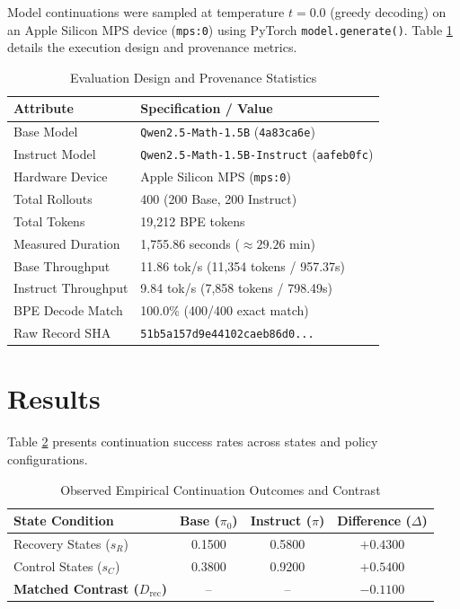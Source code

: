 \documentclass[conference]{IEEEtran}
\begin{document}
Model continuations were sampled at temperature $t=0.0$ (greedy decoding) on an Apple Silicon MPS device (\texttt{mps:0}) using PyTorch \texttt{model.generate()}. Table \ref{tab:provenance} details the execution design and provenance metrics.

\begin{table}[htbp]
\caption{Evaluation Design and Provenance Statistics}
\label{tab:provenance}
\centering
\begin{tabularx}{\columnwidth}{Xp{4.2cm}}
\toprule
\textbf{Attribute} & \textbf{Specification / Value} \\
\midrule
Base Model & \texttt{Qwen2.5-Math-1.5B} (\texttt{4a83ca6e}) \\
Instruct Model & \texttt{Qwen2.5-Math-1.5B-Instruct} (\texttt{aafeb0fc}) \\
Hardware Device & Apple Silicon MPS (\texttt{mps:0}) \\
Total Rollouts & 400 (200 Base, 200 Instruct) \\
Total Tokens & 19,212 BPE tokens \\
Measured Duration & 1,755.86 seconds ($\approx 29.26$ min) \\
Base Throughput & 11.86 tok/s (11,354 tokens / 957.37s) \\
Instruct Throughput & 9.84 tok/s (7,858 tokens / 798.49s) \\
BPE Decode Match & 100.0\% (400/400 exact match) \\
Raw Record SHA & \texttt{51b5a157d9e44102caeb86d0...} \\
\bottomrule
\end{tabularx}
\end{table}

\section{Results}
Table \ref{tab:outcomes} presents continuation success rates across states and policy configurations.

\begin{table}[htbp]
\caption{Observed Empirical Continuation Outcomes and Contrast}
\label{tab:outcomes}
\centering
\begin{tabularx}{\columnwidth}{Xccc}
\toprule
\textbf{State Condition} & \textbf{Base ($\pi_0$)} & \textbf{Instruct ($\pi$)} & \textbf{Difference ($\Delta$)} \\
\midrule
Recovery States ($s_R$) & 0.1500 & 0.5800 & $+0.4300$ \\
Control States ($s_C$) & 0.3800 & 0.9200 & $+0.5400$ \\
\midrule
\textbf{Matched Contrast ($D_{\text{rec}}$)} & -- & -- & \textbf{$-0.1100$} \\
\bottomrule
\end{tabularx}
\end{table}
\end{document}
